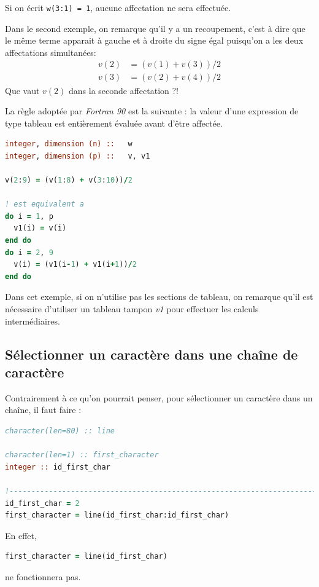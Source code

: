\documentclass[a4paper,twoside]{article}
\begin{document}
\begin{remarque}
Si on écrit \texttt{w(3:1) = 1}, aucune affectation ne sera effectuée.
\end{remarque}

Dans le second exemple, on remarque qu'il y a un recoupement, c'est à dire que le même terme apparait à gauche et à droite du signe égal puisqu'on a les deux affectations \og simultanées\fg :
\begin{align*}
v(2) &= (v(1)+v(3))/2\\
v(3) &= (v(2)+v(4))/2
\end{align*}
Que vaut $v(2)$ dans la seconde affectation ?! 

\begin{important}
La règle adoptée par \emph{Fortran 90} est la suivante : la valeur d'une expression de type tableau est entièrement évaluée avant d'être affectée. 
\end{important}

\begin{lstlisting}[language=Fortran]
integer, dimension (n) ::   w
integer, dimension (p) ::   v, v1

v(2:9) = (v(1:8) + v(3:10))/2

! est equivalent a
do i = 1, p
  v1(i) = v(i)
end do
do i = 2, 9
  v(i) = (v1(i-1) + v1(i+1))/2
end do
\end{lstlisting}

Dans cet exemple, si on n'utilise pas les sections de tableau, on remarque qu'il est nécessaire d'utiliser un tableau tampon \emph{v1} pour effectuer les calculs intermédiaires. 

\subsection{Sélectionner un caractère dans une chaîne de caractère}
Contrairement à ce qu'on pourrait penser, pour sélectionner un caractère dans un chaîne, il faut faire : 
\begin{lstlisting}[language=Fortran]
character(len=80) :: line
  
character(len=1) :: first_character
integer :: id_first_char

!------------------------------------------------------------------------------
id_first_char = 2
first_character = line(id_first_char:id_first_char)
\end{lstlisting}

En effet, 
\begin{lstlisting}[language=Fortran]
first_character = line(id_first_char)
\end{lstlisting}
ne fonctionnera pas.
\end{document}
